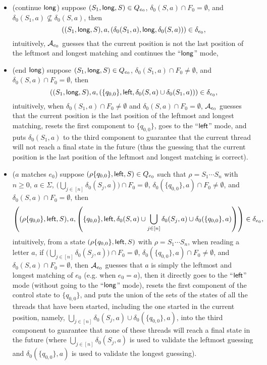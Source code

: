 \begin{itemize}
\begin{itemize}
		\item (continue $\mathsf{long}$) suppose $(S_1, \mathsf{long}, S) \in Q_{e_0}$, $\delta_0(S,a) \cap F_0 = \emptyset$, and $\delta_0(S_1,a) \not \subseteq \delta_0(S,a)$, then
		$$((S_1, \mathsf{long}, S), a, (\delta_0(S_1,a), \mathsf{long}, \delta_0(S,a))) \in \delta_{e_0},$$
		intuitively, $\mathcal{A}_{e_0}$ guesses that the current position is not the last position of the leftmost and longest matching and continues the ``$\mathsf{long}$'' mode,
		\item (end $\mathsf{long}$) suppose $(S_1, \mathsf{long}, S) \in Q_{e_0}$, $\delta_0(S_1,a) \cap F_0 \neq \emptyset$, and $\delta_0(S,a) \cap F_0 = \emptyset$, then
		$$((S_1, \mathsf{long}, S), a, (\{q_{0,0}\}, \mathsf{left}, \delta_0(S,a) \cup \delta_0(S_1,a))) \in \delta_{e_0},$$
		intuitively, when $\delta_0(S_1,a) \cap F_0 \neq \emptyset$ and $\delta_0(S,a) \cap F_0 = \emptyset$, $\mathcal{A}_{e_0}$ guesses that the current position is the last position of the leftmost and longest matching, resets the first component to $\{q_{0,0}\}$, goes to the ``$\mathsf{left}$'' mode, and puts $\delta_0(S_1, a)$ to the third component to guarantee that the current thread will not reach a final state in the future (thus the guessing that the current position is the last position of the leftmost and longest matching is correct).
		\item ($a$ matches $e_0$) suppose $(\rho \{q_{0,0}\}, \mathsf{left}, S) \in Q_{e_0}$ such that $\rho = S_1 \cdots S_n$ with $n \ge 0$,  $a \in \Sigma$, $\big(\bigcup \limits_{j \in [n]} \delta_0(S_j, a) \big) \cap F_0 = \emptyset$, $\delta_0(\{q_{0,0}\}, a) \cap F_0 \neq \emptyset$, and $\delta_0(S,a) \cap F_0 = \emptyset$, then
%
		$$\left(
		(\rho \{q_{0,0}\}, \mathsf{left}, S), a,
		\left(\{q_{0,0}\}, \mathsf{left}, \delta_0(S,a) \cup \bigcup \limits_{j \in [n]} \delta_0(S_j, a) \cup \delta_0(\{q_{0,0}\}, a) \right)
		\right) \in \delta_{e_0},$$
%
		intuitively, from a state $(\rho \{q_{0,0}\}, \mathsf{left}, S)$ with $\rho = S_1 \cdots S_n$, when reading a letter $a$, if $\big(\bigcup \limits_{j \in [n]} \delta_0(S_j, a) \big) \cap F_0 = \emptyset$, $\delta_0(\{q_{0,0}\}, a) \cap F_0 \neq \emptyset$, and $\delta_0(S,a) \cap F_0 = \emptyset$, then $\mathcal{A}_{e_0}$  guesses that $a$ is simply the leftmost and longest matching of $e_0$ (e.g. when $e_0= a$), then it directly goes to the ``$\mathsf{left}$'' mode (without going to the ``$\mathsf{long}$'' mode), resets the first component of the control state to $\{q_{0,0}\}$, and puts the union of the sets of the states of all the threads that have been started, including the one started in the current position, namely, $\bigcup \limits_{j \in [n]} \delta_0(S_j, a) \cup \delta_0(\{q_{0,0}\}, a)$, into the third component to  guarantee that none of these threads will reach a final state in the future (where $\bigcup \limits_{j \in [n]} \delta_0(S_j, a)$ is used to validate the leftmost guessing and $\delta_0(\{q_{0,0}\}, a)$ is used to validate the longest guessing).

\end{itemize}
\end{itemize}
